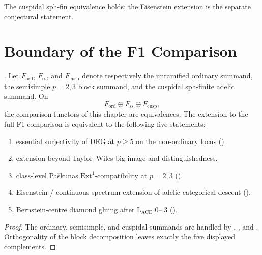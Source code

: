 The cuspidal sph-fin equivalence holds; the Eisenstein extension is the
separate conjectural statement.

\section{Boundary of the F1 Comparison}
\label{v4-arith:w5-e:residuals}

\begin{proposition}
\label{v4-arith:w5-e:prop:F1-table-refined}
\ClaimStatusProvedHere. Let \(F_{\mathrm{ord}}\),
\(F_{\mathrm{ss}}\), and \(F_{\mathrm{cusp}}\) denote respectively the
unramified ordinary summand, the semisimple \(p=2,3\) block summand, and
the cuspidal sph-finite adelic summand. On
\[
F_{\mathrm{ord}}\oplus F_{\mathrm{ss}}\oplus F_{\mathrm{cusp}},
\]
the comparison functors of this chapter are equivalences. The extension
to the full F1 comparison is equivalent to the following five
statements:
\begin{enumerate}
\item essential surjectivity of DEG at
\(p\geq 5\) on the non-ordinary locus
().
\item extension beyond Taylor--Wiles
big-image and distinguishedness.
\item class-level Pa{\v s}k{\=u}nas
\(\mathrm{Ext}^{1}\)-compatibility at \(p=2,3\)
().
\item Eisenstein /
continuous-spectrum extension of adelic categorical descent
().
\item Bernstein-centre diamond gluing after
\(\mathrm{L}_{\mathrm{ACD}}\).0--.3
().
\end{enumerate}
\end{proposition}

\begin{proof}
The ordinary, semisimple, and cuspidal summands are handled by
,
, and
. Orthogonality of the block
decomposition leaves exactly the five displayed complements.
\end{proof}
